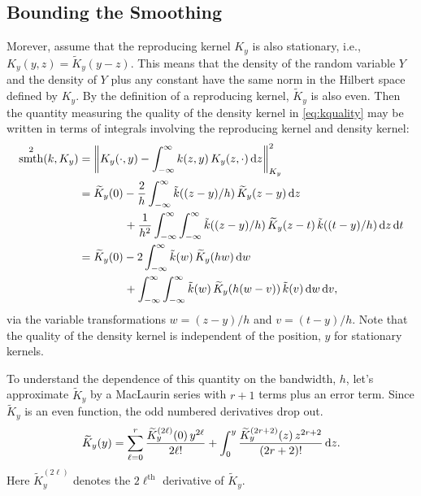 \documentclass[letterpaper]{amsart}
\newcommand{\KY}{K_y}
\newcommand{\tKY}{\widetilde{K}_y}
\newcommand{\tk}{\tilde{k}}
\DeclareMathOperator{\smooth}{smth}
\begin{document}
\subsection{Bounding the Smoothing} Morever, assume that the reproducing kernel $\KY$ is also stationary, i.e., $\KY(y,z) = \tKY(y-z)$. This means that the density of the random variable $Y$ and the density of $Y$ plus any constant have the same norm in the Hilbert space defined by $\KY$.  By the definition of a reproducing kernel, $\tKY$ is also even. Then the quantity measuring the quality of the density kernel in \eqref{eq:kquality} may be written in terms of integrals involving the reproducing kernel and density kernel:
\begin{align*}
	\smooth^2(k,\KY) & = \norm[\KY]{\KY(\cdot,y) - \int_{-\infty}^{\infty} k(z,y) \, \KY(z,\cdot) \, \dif z}^2 \\
	&=  \tKY(0) -  \frac 2h \int_{-\infty}^{\infty} \tk((z-y)/h) \, \tKY(z-y) \, \dif z \\
	& \qquad \qquad + \frac 1{h^2} \int_{-\infty}^{\infty} \int_{-\infty}^{\infty}  \tk((z-y)/h)  \, \tKY(z-t) \, \tk((t-y)/h) \, \dif z \, \dif t \\
	&=   \tKY(0) - 2 \int_{-\infty}^{\infty} \tk(w) \, \tKY(hw) \, \dif w \\
	& \qquad \qquad + \int_{-\infty}^{\infty} \int_{-\infty}^{\infty}  \tk(w) \, \tKY(h(w-v)) \, \tk(v)\, \dif w \, \dif v,
\end{align*}
via the variable transformations $w = (z-y)/h$ and $v = (t-y)/h$. Note that the quality of the density kernel is independent of the position, $y$ for stationary kernels.

To understand the dependence of this quantity on the bandwidth, $h$, let's approximate $\tKY$ by a MacLaurin series with $r+1$ terms plus an error term.  Since $\tKY$ is an even function, the odd numbered derivatives drop out.
\begin{equation*}
	\tKY(y)  = \sum_{\ell = 0}^{r} \frac{\tKY^{(2\ell)}(0) \, y^{2\ell}}{2\ell!} + \int_0^y \frac{\tKY^{(2r+2)}(z) \,  z^{2r+2}}{(2r+2)!} \, \dif z.
\end{equation*}
Here $\tKY^{(2\ell)}$ denotes the $2\ell^{\text{th}}$ derivative of $\tKY$.
\end{document}
